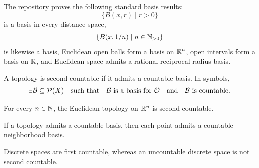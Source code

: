 \begin{example}\label{ex:metric-euclidean-bases-3-4-3-5}
\leanok
The repository proves the following standard basis results:
\[
\{B(x,r)\mid r>0\}
\]
is a basis in every distance space,
\[
\{B(x,1/n)\mid n\in\mathbb{N}_{>0}\}
\]
is likewise a basis, Euclidean open balls form a basis on $\mathbb{R}^n$, open intervals form a basis on $\mathbb{R}$, and Euclidean space admits a rational reciprocal-radius basis.
\end{example}

\begin{definition}\label{def:second-countable-3-6}
\leanok
A topology is second countable if it admits a countable basis.
In symbols,
\[
\exists \mathcal{B}\subseteq\mathcal{P}(X)
\quad \text{such that} \quad
\mathcal{B} \text{ is a basis for } \mathcal{O}
\quad \text{and} \quad
\mathcal{B} \text{ is countable}.
\]
\end{definition}

\begin{proposition}\label{prop:euclidean-second-countable-3-6}
\leanok
For every $n\in\mathbb{N}$, the Euclidean topology on $\mathbb{R}^n$ is second countable.
\end{proposition}

\begin{proposition}\label{prop:second-implies-first-3-7}
\leanok
If a topology admits a countable basis, then each point admits a countable neighborhood basis.
\end{proposition}

\begin{example}\label{ex:discrete-countability-3-8}
\leanok
Discrete spaces are first countable, whereas an uncountable discrete space is not second countable.
\end{example}


